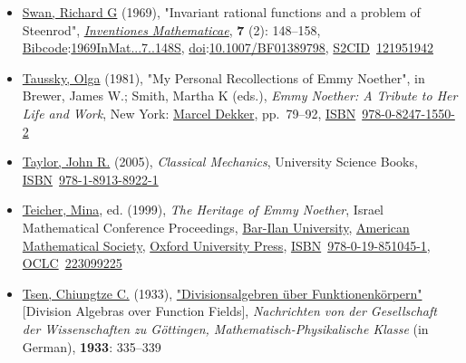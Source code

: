 \begin{itemize}
\item
  \href{https://en.wikipedia.org/wiki/Richard_Swan}{Swan, Richard G} (1969), "Invariant rational functions and a problem of Steenrod", \emph{\href{https://en.wikipedia.org/wiki/Inventiones_Mathematicae}{Inventiones Mathematicae}}, \textbf{7} (2): {148--}158, \href{https://en.wikipedia.org/wiki/Bibcode_(identifier)}{Bibcode}:\href{https://ui.adsabs.harvard.edu/abs/1969InMat...7..148S}{1969InMat...7..148S}, \href{https://en.wikipedia.org/wiki/Doi_(identifier)}{doi}:\href{https://doi.org/10.1007\%2FBF01389798}{10.1007/BF01389798}, \href{https://en.wikipedia.org/wiki/S2CID_(identifier)}{S2CID}{~}\href{https://api.semanticscholar.org/CorpusID:121951942}{121951942}{}
\item
  \href{https://en.wikipedia.org/wiki/Olga_Taussky-Todd}{Taussky, Olga} (1981), "My Personal Recollections of Emmy Noether", in Brewer, James W.; Smith, Martha K (eds.), \emph{Emmy Noether: A Tribute to Her Life and Work}, New York: \href{https://en.wikipedia.org/wiki/Marcel_Dekker}{Marcel Dekker}, pp.{~}{79--}92, \href{https://en.wikipedia.org/wiki/ISBN_(identifier)}{ISBN}{~}\href{https://en.wikipedia.org/wiki/Special:BookSources/978-0-8247-1550-2}{978-0-8247-1550-2}{}
\item
  \href{https://en.wikipedia.org/wiki/John_R._Taylor}{Taylor, John R.} (2005), \emph{Classical Mechanics}, University Science Books, \href{https://en.wikipedia.org/wiki/ISBN_(identifier)}{ISBN}{~}\href{https://en.wikipedia.org/wiki/Special:BookSources/978-1-8913-8922-1}{978-1-8913-8922-1}{}
\item
  \href{https://en.wikipedia.org/wiki/Mina_Teicher}{Teicher, Mina}, ed. (1999), \emph{The Heritage of Emmy Noether}, Israel Mathematical Conference Proceedings, \href{https://en.wikipedia.org/wiki/Bar-Ilan_University}{Bar-Ilan University}, \href{https://en.wikipedia.org/wiki/American_Mathematical_Society}{American Mathematical Society}, \href{https://en.wikipedia.org/wiki/Oxford_University_Press}{Oxford University Press}, \href{https://en.wikipedia.org/wiki/ISBN_(identifier)}{ISBN}{~}\href{https://en.wikipedia.org/wiki/Special:BookSources/978-0-19-851045-1}{978-0-19-851045-1}, \href{https://en.wikipedia.org/wiki/OCLC_(identifier)}{OCLC}{~}\href{https://search.worldcat.org/oclc/223099225}{223099225}{}
\item
  \href{https://en.wikipedia.org/wiki/Chiungtze_Tsen}{Tsen, Chiungtze C.} (1933), \href{https://gdz.sub.uni-goettingen.de/id/PPN252457811_1933}{"Divisionsalgebren über Funktionenkörpern"} {{[}}Division Algebras over Function Fields{{]}}, \emph{Nachrichten von der Gesellschaft der Wissenschaften zu Göttingen, Mathematisch-Physikalische Klasse} (in German), \textbf{1933}: {335--}339{}

\end{itemize}
